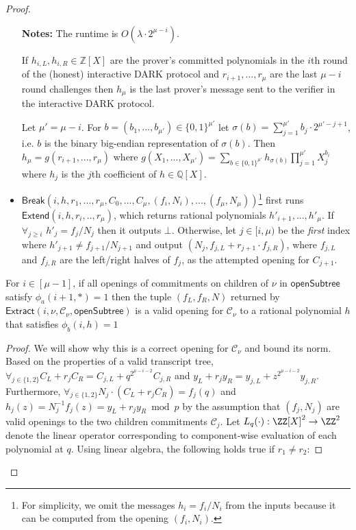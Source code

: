 \begin{proof}
\begin{itemize}
\textbf{Notes:} 
The runtime is $O(\lambda \cdot 2^{\mu - i})$. 

If $h_{i,L}, h_{i,R}  \in \mathbb{Z}[X]$ are the prover's committed polynomials in the $i$th round of the (honest) interactive DARK protocol and $r_{i+1},...,r_\mu$ are the last $\mu - i$ round challenges then $h_\mu$ is the last prover's message sent to the verifier in the interactive DARK protocol. 

 Let $\mu' = \mu - i$. For $b = (b_1,...,b_{\mu'}) \in \{0,1\}^{\mu'}$ let $\sigma(b) = \sum_{j =1}^{\mu'} b_j \cdot 2^{\mu' - j + 1}$, i.e. $b$ is the binary big-endian representation of $\sigma(b)$. Then $h_\mu = g(r_{i+1},...,r_\mu)$ where $g(X_1,...,X_{\mu'}) = \sum_{b \in \{0,1\}^{\mu'}} h_{\sigma(b)} \prod_{j=1}^{\mu'}X_j^{b_i}$ where $h_j$ is the $j$th coefficient of $h \in \mathbb{Q}[X]$. 
 
 \item $\textsf{Break}(i, h, r_1,...,r_\mu, C_0,...,C_\mu, (f_i, N_i),...,(f_\mu, N_\mu))$\footnote{For simplicity, we omit the messages $h_i = f_i/N_i$ from the inputs because it can be computed from the opening $(f_i, N_i)$.}  first runs $\textsf{Extend}(i, h, r_i,..,r_{\mu})$, which returns rational polynomials $h'_{i+1},...,h'_{\mu}$. If $\forall_{j \geq i}$ $h'_j = f_j/N_j$ then it outputs $\bot$. Otherwise, let $j \in [i, \mu)$ be the \textit{first} index where $h'_{j+1}\neq f_{j+1}/N_{j+1}$ and output $(N_j, f_{j, L} + r_{j+1} \cdot  f_{j, R})$, where $f_{j, L}$ and $f_{j, R}$ are the left/right halves of $f_j$, as the attempted opening for $C_{j+1}$.
\end{itemize}

\begin{subclaim} 
For $i \in [\mu-1]$, if all openings of commitments on children of $\nu$ in $\textsf{openSubtree}$ satisfy $\phi_a(i+1, *)=1$ then the tuple $(f_L, f_R, N)$ returned by $\textsf{Extract}(i, \nu, \mathcal{C}_\nu, \textsf{openSubtree})$ is a valid opening for $\mathcal{C}_\nu$ to a rational polynomial $h$ that satisfies $\phi_b(i, h) = 1$ 
\end{subclaim} 

\begin{proof}
We will show why this is a correct opening for $\mathcal{C}_\nu$ and bound its norm. Based on the properties of a valid transcript tree, $\forall_{j \in \{1,2\}} C_L + r_j C_R =  C_{j,L} + q^{2^{\mu - i - 2}} C_{j,R}$ and $y_L + r_j y_R = y_{j,L} + z^{2^{\mu - i -2}} y_{j, R}$. Furthermore, $\forall_{j \in \{1,2\}} N_j \cdot (C_L + r_j C_R ) = f_j(q)$ and $h_j(z) = N_j^{-1} f_j(z) = y_L + r_j y_R \bmod p$ by the assumption that $(f_j, N_j)$ are valid openings to the two children commitments $\mathcal{C}_j$.  Let $L_q(\cdot): \ZZ[X]^2 \rightarrow \ZZ^2$ denote the linear operator corresponding to component-wise evaluation of each polynomial at $q$. Using linear algebra, the following holds true if $r_1 \neq r_2$:


\end{proof}
\end{proof}
